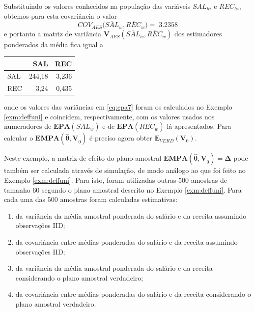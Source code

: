 \documentclass[]{book}
\theoremstyle{definition}
\theoremstyle{definition}
\theoremstyle{definition}
\theoremstyle{remark}
\begin{document}
Substituindo os valores conhecidos na população das variáveis
\(SAL_{hi}\) e \(REC_{hi}\), obtemos para esta covariância o valor \[
COV_{AES}(\overline{SAL}_{w},\overline{REC}_{w}\mathbf{)=\;}3.2358
\] e portanto a matriz de variância
\(\mathbf{V}_{AES}(\overline{SAL}_{w},\overline{REC}_{w})\) dos
estimadores ponderados da média fica igual a

\begin{center}

\begin{tabular}{l|r|r}
\hline
  & SAL & REC\\
\hline
SAL & 244,18 & 3,236\\
\hline
REC & 3,24 & 0,435\\
\hline
\end{tabular}
\end{center}

onde os valores das variâncias em \eqref{eq:epa7} foram os calculados no
Exemplo \ref{exm:deffuni} e coincidem, respectivamente, com os valores
usados nos numeradores de
\(\mathbf{EPA}\left( \overline{SAL}_{w}\right)\) e de
\(\mathbf{EPA}\left( \overline{REC}_{w}\right)\) lá apresentados. Para
calcular o \(\mathbf{EMPA}(\mathbf{\hat{\theta},V}_{0})\) é preciso
agora obter \(\mathbf{E}_{VERD}\left(\mathbf{V}_{0}\right)\).

Neste exemplo, a matriz de efeito do plano amostral
\(\mathbf{EMPA}(\mathbf{\hat{\theta},V}_{0})=\mathbf{\Delta }\) pode
também ser calculada através de simulação, de modo análogo ao que foi
feito no Exemplo \ref{exm:deffuni}. Para isto, foram utilizadas outras
\(500\) amostras de tamanho \(60\) segundo o plano amostral descrito no
Exemplo \ref{exm:deffuni}. Para cada uma das \(500\) amostras foram
calculadas estimativas:

\begin{enumerate}
\def\labelenumi{\arabic{enumi}.}
\item
  da variância da média amostral ponderada do salário e da receita
  assumindo observações IID;
\item
  da covariância entre médias ponderadas do salário e da receita
  assumindo observações IID;
\item
  da variância da média amostral ponderada do salário e da receita
  considerando o plano amostral verdadeiro;
\item
  da covariância entre médias ponderadas do salário e da receita
  considerando o plano amostral verdadeiro.
\end{enumerate}
\end{document}
